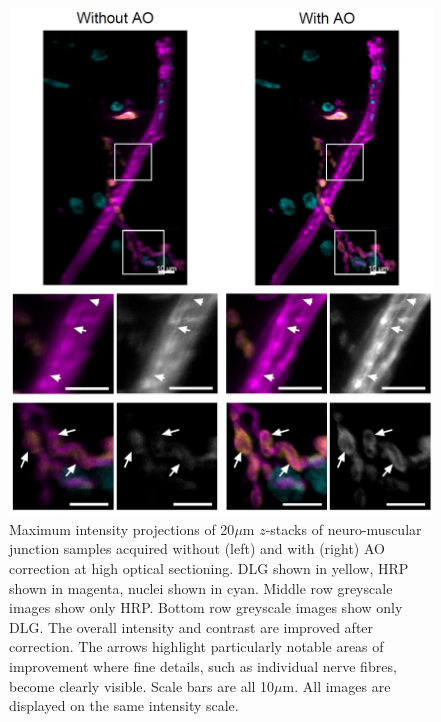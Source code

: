 \begin{figure}[h]
	\centering
	\includegraphics[width=\textwidth]{images/Aurox_NMJ_composite_grey_and_color.jpg}
	\caption[\textit{Drosophila} neuro-muscular junction data acquired on the Aurox imaging 
	system]{Maximum intensity projections of 20$\mu$m $z$-stacks of 
		neuro-muscular junction samples acquired without (left) and with 
		(right) AO correction at high optical sectioning. 
		DLG shown in yellow, HRP shown in magenta, nuclei shown in cyan. 
		Middle row greyscale images show only HRP. Bottom row greyscale 
		images show only DLG. The overall intensity and contrast are 
		improved after correction. The arrows highlight particularly 
		notable areas of improvement where fine details, such as 
		individual nerve fibres, become clearly visible. Scale bars are 
		all 10$\mu$m. All images are displayed on the same intensity 
		scale.}
	\label{fig:Aurox_NMJ_composite_grey_and_color}
\end{figure}
